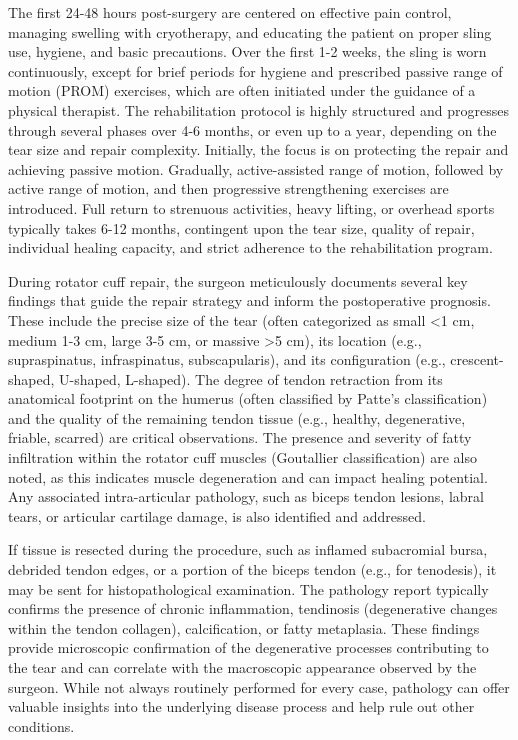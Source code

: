 The first 24-48 hours post-surgery are centered on effective pain control, managing swelling with cryotherapy, and educating the patient on proper sling use, hygiene, and basic precautions. Over the first 1-2 weeks, the sling is worn continuously, except for brief periods for hygiene and prescribed passive range of motion (PROM) exercises, which are often initiated under the guidance of a physical therapist. The rehabilitation protocol is highly structured and progresses through several phases over 4-6 months, or even up to a year, depending on the tear size and repair complexity. Initially, the focus is on protecting the repair and achieving passive motion. Gradually, active-assisted range of motion, followed by active range of motion, and then progressive strengthening exercises are introduced. Full return to strenuous activities, heavy lifting, or overhead sports typically takes 6-12 months, contingent upon the tear size, quality of repair, individual healing capacity, and strict adherence to the rehabilitation program.

During rotator cuff repair, the surgeon meticulously documents several key findings that guide the repair strategy and inform the postoperative prognosis. These include the precise size of the tear (often categorized as small <1 cm, medium 1-3 cm, large 3-5 cm, or massive >5 cm), its location (e.g., supraspinatus, infraspinatus, subscapularis), and its configuration (e.g., crescent-shaped, U-shaped, L-shaped). The degree of tendon retraction from its anatomical footprint on the humerus (often classified by Patte's classification) and the quality of the remaining tendon tissue (e.g., healthy, degenerative, friable, scarred) are critical observations. The presence and severity of fatty infiltration within the rotator cuff muscles (Goutallier classification) are also noted, as this indicates muscle degeneration and can impact healing potential. Any associated intra-articular pathology, such as biceps tendon lesions, labral tears, or articular cartilage damage, is also identified and addressed.

If tissue is resected during the procedure, such as inflamed subacromial bursa, debrided tendon edges, or a portion of the biceps tendon (e.g., for tenodesis), it may be sent for histopathological examination. The pathology report typically confirms the presence of chronic inflammation, tendinosis (degenerative changes within the tendon collagen), calcification, or fatty metaplasia. These findings provide microscopic confirmation of the degenerative processes contributing to the tear and can correlate with the macroscopic appearance observed by the surgeon. While not always routinely performed for every case, pathology can offer valuable insights into the underlying disease process and help rule out other conditions.

